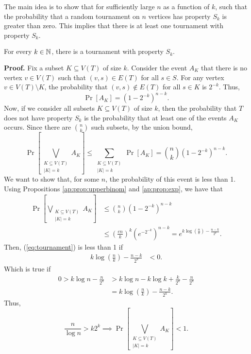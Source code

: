 The main idea is to show that for sufficiently large $n$ as a function of $k$, such that the probability that a random tournament on $n$ vertices has property $S_k$ is greater than zero. This implies that there is at least one tournament with property $S_k$. \par


\begin{theorem}
    For every $k \in \mathbb{N}$, there is a tournament with property $S_k$. 
\end{theorem}

\textbf{Proof. } Fix a subset $K \subseteq V(T)$ of size $k$. Consider the event $A_K$ that there is no vertex $v \in V(T)$ such that $(v, s) \in E(T)$ for all $s \in S$. For any vertex $v \in V(T) \setminus K$, the probability that $(v, s) \notin E(T)$ for all $s \in K$ is $2^{-k}$. Thus,
\[\Pr[A_K] = \left(1 - 2^{-k}\right)^{n - k}.\]
Now, if we consider all subsets $K \subseteq V(T)$ of size $k$, then the probability that $T$ does not have property $S_k$ is the probability that at least one of the events $A_K$ occurs. Since there are $\binom{n}{k}$ such subsets, by the union bound,
\[\Pr\left[\bigvee_{\substack{K \subseteq V(T) \\ |K| = k}} A_K\right] \leq \sum_{\substack{K \subseteq V(T) \\ |K| = k}}\Pr[A_K] = \binom{n}{k}\left(1 - 2^{-k}\right)^{n - k}.\]
We want to show that, for some $n$, the probability of this event is less than 1. Using Propositions \ref{ap:prop:upperbinom} and \ref{ap:prop:exp}, we have that
\begin{align}
    \Pr\left[\bigvee_{\substack{K \subseteq V(T) \\ |K| = k}} A_K\right] &\leq \binom{n}{k}\left(1 - 2^{-k}\right)^{n - k} \\
    &\leq \left(\frac{en}{k}\right)^k\left(e^{-2^{-k}}\right)^{n - k} = e^{k\log\left(\frac{n}{k}\right) - \frac{n - k}{2^k}}. \label{eq:tournament}
\end{align}
Then, (\ref{eq:tournament}) is less than 1 if
\begin{align*}
    k\log\left(\frac{n}{k}\right) - \frac{n - k}{2^k} &< 0.
\end{align*}
Which is true if 
\begin{align*}
  0 >  k\log n - \frac{n}{2^k} &> k\log n - k\log k + \frac{k}{2^k} - \frac{n}{2^k}\\
  &= k\log\left(\frac{n}{k}\right) - \frac{n - k}{2^k}.
\end{align*}
Thus,
\[\frac{n}{\log n} > k2^k \implies  \Pr\left[\bigvee_{\substack{K \subseteq V(T) \\ |K| = k}} A_K\right] < 1.\]

